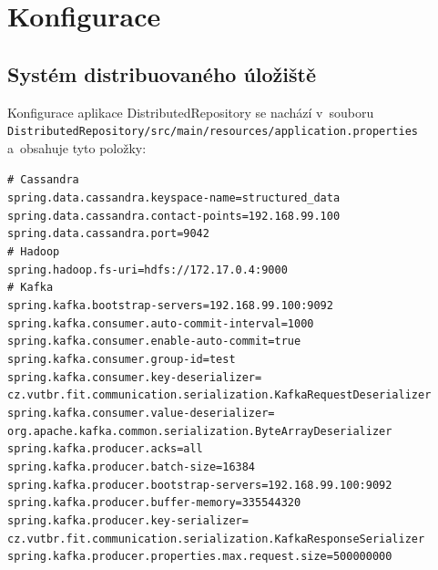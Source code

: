 \chapter{Konfigurace} \label{configuration}
\section{Systém distribuovaného úložiště}
Konfigurace aplikace DistributedRepository se nachází v~souboru \\ \texttt{DistributedRepository/src/main/resources/application.properties} \\
a~obsahuje tyto položky:

\vspace{0.5cm}
\noindent \texttt{\#   Cassandra \\
spring.data.cassandra.keyspace-name=structured\_data \\
spring.data.cassandra.contact-points=192.168.99.100 \\
spring.data.cassandra.port=9042 \\
\#   Hadoop \\
spring.hadoop.fs-uri=hdfs://172.17.0.4:9000 \\
\#   Kafka \\
spring.kafka.bootstrap-servers=192.168.99.100:9092 \\
spring.kafka.consumer.auto-commit-interval=1000 \\
spring.kafka.consumer.enable-auto-commit=true \\
spring.kafka.consumer.group-id=test \\
spring.kafka.consumer.key-deserializer= \\
\indent cz.vutbr.fit.communication.serialization.KafkaRequestDeserializer \\
spring.kafka.consumer.value-deserializer= \\
\indent org.apache.kafka.common.serialization.ByteArrayDeserializer \\
spring.kafka.producer.acks=all \\
spring.kafka.producer.batch-size=16384 \\
spring.kafka.producer.bootstrap-servers=192.168.99.100:9092 \\
spring.kafka.producer.buffer-memory=335544320 \\
spring.kafka.producer.key-serializer= \\
\indent cz.vutbr.fit.communication.serialization.KafkaResponseSerializer \\
spring.kafka.producer.properties.max.request.size=500000000 \\
}
